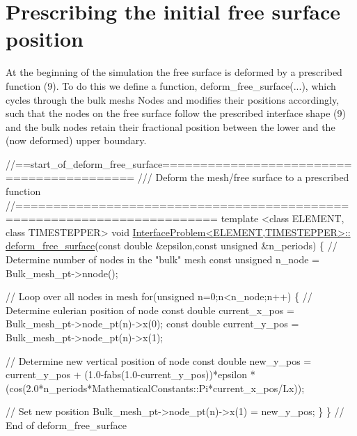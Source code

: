  

\hypertarget{index_deform_free_surface}{}\section{Prescribing the initial free surface position}\label{index_deform_free_surface}
At the beginning of the simulation the free surface is deformed by a prescribed function (9). To do this we define a function, {\ttfamily deform\+\_\+free\+\_\+surface}(...), which cycles through the bulk mesh\textquotesingle{}s {\ttfamily Nodes} and modifies their positions accordingly, such that the nodes on the free surface follow the prescribed interface shape (9) and the bulk nodes retain their fractional position between the lower and the (now deformed) upper boundary.


\begin{DoxyCodeInclude}
\textcolor{comment}{//==start\_of\_deform\_free\_surface==========================================}
\textcolor{comment}{/// Deform the mesh/free surface to a prescribed function}
\textcolor{comment}{}\textcolor{comment}{//========================================================================}
\textcolor{keyword}{template} <\textcolor{keyword}{class} ELEMENT, \textcolor{keyword}{class} TIMESTEPPER>
\textcolor{keywordtype}{void} \hyperlink{classInterfaceProblem_a2319232b08d9df1ab473f6cbd40939d5}{InterfaceProblem<ELEMENT,TIMESTEPPER>::}
\hyperlink{classInterfaceProblem_a2319232b08d9df1ab473f6cbd40939d5}{deform\_free\_surface}(\textcolor{keyword}{const} \textcolor{keywordtype}{double} &epsilon,\textcolor{keyword}{const} \textcolor{keywordtype}{unsigned} &n\_periods)
\{
 \textcolor{comment}{// Determine number of nodes in the "bulk" mesh}
 \textcolor{keyword}{const} \textcolor{keywordtype}{unsigned} n\_node = Bulk\_mesh\_pt->nnode();
 
 \textcolor{comment}{// Loop over all nodes in mesh}
 \textcolor{keywordflow}{for}(\textcolor{keywordtype}{unsigned} n=0;n<n\_node;n++)
  \{
   \textcolor{comment}{// Determine eulerian position of node}
   \textcolor{keyword}{const} \textcolor{keywordtype}{double} current\_x\_pos = Bulk\_mesh\_pt->node\_pt(n)->x(0);
   \textcolor{keyword}{const} \textcolor{keywordtype}{double} current\_y\_pos = Bulk\_mesh\_pt->node\_pt(n)->x(1);
   
   \textcolor{comment}{// Determine new vertical position of node}
   \textcolor{keyword}{const} \textcolor{keywordtype}{double} new\_y\_pos = current\_y\_pos
    + (1.0-fabs(1.0-current\_y\_pos))*epsilon
    *(cos(2.0*n\_periods*MathematicalConstants::Pi*current\_x\_pos/Lx));
   
   \textcolor{comment}{// Set new position}
   Bulk\_mesh\_pt->node\_pt(n)->x(1) = new\_y\_pos;
  \}
\} \textcolor{comment}{// End of deform\_free\_surface}

\end{DoxyCodeInclude}




